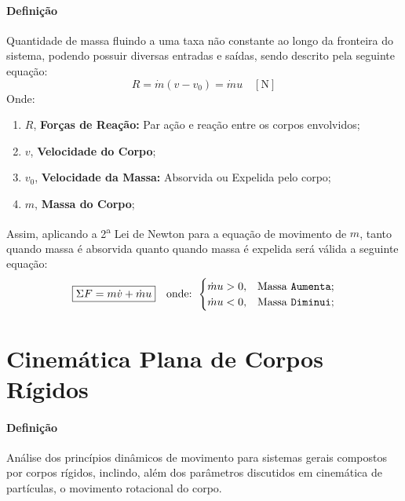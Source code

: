 \documentclass{article}
\begin{document}
            \paragraph{Definição}Quantidade de massa fluindo a uma taxa não constante ao longo da fronteira do sistema, podendo possuir diversas entradas e saídas, sendo descrito pela seguinte equação:
                \begin{equation}
                    \boxed{
                        R = \dot{m} (v - v_{0}) = \dot{m} u
                        \quad
                        [\text{N}]
                    }
                \end{equation}
            Onde:
                \begin{enumerate}[rightmargin = \leftmargin, noitemsep]
                    \item $R$, \textbf{Forças de Reação:} Par ação e reação entre os corpos envolvidos;
                    \item $v$, \textbf{Velocidade do Corpo};
                    \item $v_{0}$, \textbf{Velocidade da Massa:} Absorvida ou Expelida pelo corpo;
                    \item $m$, \textbf{Massa do Corpo};
                \end{enumerate}
            Assim, aplicando a 2\textsuperscript{a} Lei de Newton para a equação de movimento de $m$, tanto quando massa é absorvida quanto quando massa é expelida será válida a seguinte equação:
                \begin{equation}
                    \boxed{
                        \Sigma F = m \dot{v} + \dot{m} u
                    }
                    \quad
                    \text{onde: }
                    \begin{cases}
                        \dot{m} u > 0, & \text{Massa \texttt{Aumenta}};\\
                        \dot{m} u < 0, & \text{Massa \texttt{Diminui}};\\
                    \end{cases}
                \end{equation}
\newpage

    \section{Cinemática Plana de Corpos Rígidos}
        \paragraph{Definição}Análise dos princípios dinâmicos de movimento para sistemas gerais compostos por corpos rígidos, inclindo, além dos parâmetros discutidos em cinemática de partículas, o movimento rotacional do corpo.
\end{document}
